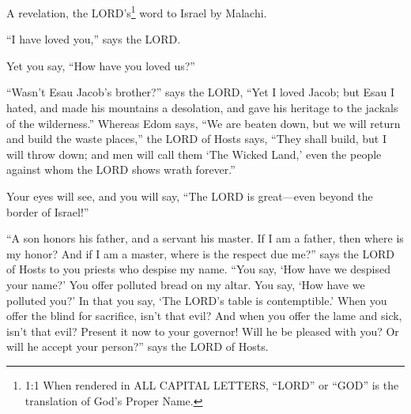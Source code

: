 \newpage
\null
\thispagestyle{empty}
\newpage






\vspace{-1.36in}


\mychapter{} \myverse*{}A revelation, the LORD’s\footnote{1:1 When rendered in ALL CAPITAL LETTERS, “LORD” or “GOD” is the translation of God’s Proper Name.} word to Israel by Malachi.


\myverse{}“I have loved you,” says the LORD.

Yet you say, “How have you loved us?”

“Wasn’t Esau Jacob’s brother?” says the LORD, “Yet I loved Jacob; \myverse{}but Esau I hated, and made his mountains a desolation, and gave his heritage to the jackals of the wilderness.” \myverse{}Whereas Edom says, “We are beaten down, but we will return and build the waste places,” the LORD of Hosts says, “They shall build, but I will throw down; and men will call them ‘The Wicked Land,’ even the people against whom the LORD shows wrath forever.”


\myverse{}Your eyes will see, and you will say, “The LORD is great—even beyond
the border of Israel!”


\myverse{}“A son honors his father, and a servant his master. If I am a father, then where is my honor? And if I am a master, where is the respect due me?” says the LORD of Hosts to you priests who despise my name. “You say, ‘How have we despised your name?’ \myverse{}You offer polluted bread on my altar. You say, ‘How have we polluted you?’ In that you say, ‘The LORD’s table is contemptible.’ \myverse{}When you offer the blind for sacrifice, isn’t that evil? And when you offer the lame and sick, isn’t that evil? Present it now to your governor! Will he be pleased with you? Or will he accept your person?” says the LORD of Hosts.


